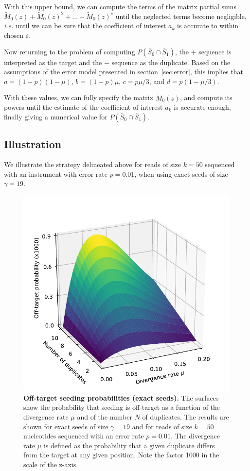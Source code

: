 \documentclass{article}
\begin{document}
With this upper bound, we can compute the terms of the matrix partial sums
$\tilde{M}_0(z) + \tilde{M}_0(z)^2 + \ldots + \tilde{M}_0(z)^s$ until the
neglected terms become negligible, \textit{i.e.} until we can be sure that
the coefficient of interest $a_k$ is accurate to within chosen
$\varepsilon$.

Now returning to the problem of computing $P(\overline{S}_0 \cap
\overline{S}_1)$, the $+$ sequence is interpreted as the target and the
$-$ sequence as the duplicate. Based on the assumptions of the error model
presented in section~\ref{sec:error}, this implies that $a =
(1-p)(1-\mu)$, $b = (1-p)\mu$, $c = p\mu/3$, and $d = p(1-\mu/3)$.

With these values, we can fully specify the matrix $\tilde{M}_0(z)$, and
compute its powers until the estimate of the coefficient of interest $a_k$
is accurate enough, finally giving a numerical value for $P(\overline{S}_0
\cap \overline{S}_1)$.


\subsection{Illustration}
\label{sec:illdual}

We illustrate the strategy delineated above for reads of size $k=50$
sequenced with an instrument with error rate $p=0.01$, when using exact
seeds of size $\gamma=19$.

\begin{figure}[h]
\centering
\includegraphics[scale=0.65]{curves_exact.pdf}
\caption{\textbf{Off-target seeding probabilities (exact seeds).} The
surfaces show the probability that seeding is off-target as a function of
the divergence rate $\mu$ and of the number $N$ of duplicates. The results
are shown for exact seeds of size $\gamma=19$ and for reads of size $k=50$
nucleotides sequenced with an error rate $p=0.01$. The divergence rate
$\mu$ is defined as the probability that a given duplicate differs from
the target at any given position. Note the factor 1000 in the scale of the
z-axis.}
\label{fig:curves_exact}
\end{figure}
\end{document}
